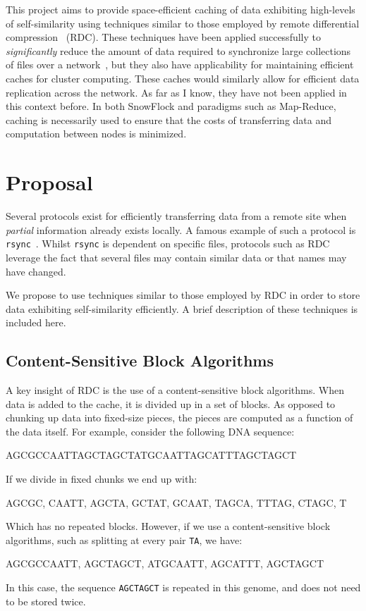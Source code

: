 \documentclass{article}[12pt]
\begin{document}
This project aims to provide space-efficient caching of data exhibiting
high-levels of self-similarity using techniques similar to those employed by
remote differential compression~\cite{rdc} (RDC).  These techniques have been
applied successfully to {\em significantly} reduce the amount of data required
to synchronize large collections of files over a network~\cite{improvedfile},
but they also have applicability for maintaining efficient caches for cluster
computing.  These caches would similarly allow for efficient data replication
across the network.  As far as I know, they have not been applied in this
context before.  In both SnowFlock and paradigms such as Map-Reduce, caching is
necessarily used to ensure that the costs of transferring data and computation
between nodes is minimized.

\section*{Proposal}
\label{sec:proposal}

Several protocols exist for efficiently transferring data from a remote site
when {\em partial} information already exists locally.  A famous example of
such a protocol is {\tt rsync}~\cite{rsync}.  Whilst {\tt rsync} is dependent
on specific files, protocols such as RDC~\cite{rdc} leverage the fact that
several files may contain similar data or that names may have changed.

We propose to use techniques similar to those employed by RDC in order to
store data exhibiting self-similarity efficiently.  A brief description of
these techniques is included here.

\subsection*{Content-Sensitive Block Algorithms}

A key insight of RDC is the use of a content-sensitive block algorithms.  When
data is added to the cache, it is divided up in a set of blocks.  As opposed to
chunking up data into fixed-size pieces, the pieces are computed as a function
of the data itself.  For example, consider the following DNA sequence:
\begin{center}
AGCGCCAATTAGCTAGCTATGCAATTAGCATTTAGCTAGCT
\end{center}
If we divide in fixed chunks we end up with:
\begin{center}
AGCGC, CAATT, AGCTA, GCTAT, GCAAT, TAGCA, TTTAG, CTAGC, T
\end{center}
Which has no repeated blocks.  However, if we use a content-sensitive block
algorithms, such as splitting at every pair {\tt TA}, we have:
\begin{center}
AGCGCCAATT, AGCTAGCT, ATGCAATT, AGCATTT, AGCTAGCT
\end{center}
In this case, the sequence {\tt AGCTAGCT} is repeated in this genome, and does
not need to be stored twice.
\end{document}
